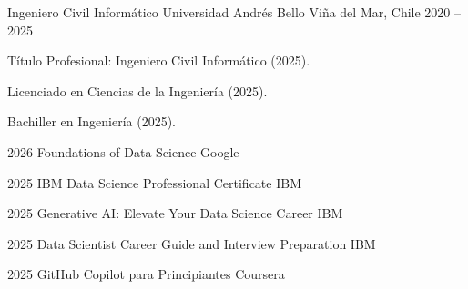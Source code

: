 
\begin{cventries}

\cventry
  {Ingeniero Civil Informático}
  {Universidad Andrés Bello}
  {Viña del Mar, Chile}
  {2020 -- 2025}
  {
    \begin{cvitems}
      \item {Título Profesional: Ingeniero Civil Informático (2025).}
      \item {Licenciado en Ciencias de la Ingeniería (2025).}
      \item {Bachiller en Ingeniería (2025).}
    \end{cvitems}
  }

\end{cventries}


\begin{cventries}

\cventry
  {2026}
  {Foundations of Data Science}
  {Google}
  {}
  {}

\cventry
  {2025}
  {IBM Data Science Professional Certificate}
  {IBM}
  {}
  {}

\cventry
  {2025}
  {Generative AI: Elevate Your Data Science Career}
  {IBM}
  {}
  {}

\cventry
  {2025}
  {Data Scientist Career Guide and Interview Preparation}
  {IBM}
  {}
  {}

\cventry
  {2025}
  {GitHub Copilot para Principiantes}
  {Coursera}
  {}
  {}

\end{cventries}